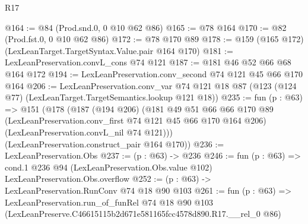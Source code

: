 \begin{lexlean}{R17}
\begin{coremodule}
@164 := @84 (Prod.snd.{0, 0} @10 @62 @86)
@165 := @78 @164
@170 := @82 (Prod.fst.{0, 0} @10 @62 @86)
@172 := @78 @170 @89
@178 := @159 (@165 @172) (LexLeanTarget.TargetSyntax.Value.pair @164 @170)
@181 := LexLeanPreservation.convL_cons @74 @121
@187 := @181 @46 @52 @66 @68 @164 @172
@194 := LexLeanPreservation.conv_second @74 @121 @45 @66 @170 @164
@206 := LexLeanPreservation.conv_var
    @74
    @121
    @18
    @87
    (@123 (@124 @77) (LexLeanTarget.TargetSemantics.lookup @121 @18))
@235 := fun (p : @63) =>
  @151
    (@178
      (@187
        (@194 @206)
        (@181
          @49
          @51
          @66
          @66
          @170
          @89
          (LexLeanPreservation.conv_first @74 @121 @45 @66 @170 @164 @206)
          (LexLeanPreservation.convL_nil @74 @121)))
      (LexLeanPreservation.construct_pair @164 @170))
@236 := LexLeanPreservation.Obs
@237 := (p : @63) -> @236
@246 := fun (p : @63) =>
  cond.{1} @236 @94 (LexLeanPreservation.Obs.value @102) LexLeanPreservation.Obs.overflow
@252 := (p : @63) -> LexLeanPreservation.RunConv @74 @18 @90 @103
@261 := fun (p : @63) =>
  LexLeanPreservation.run_of_funRel
    @74
    @18
    @90
    @103
    (LexLeanPreserve.C46615115b2d671e581165fcc4578d890.R17.__rel_0 @86)
\end{coremodule}
\end{lexlean}
